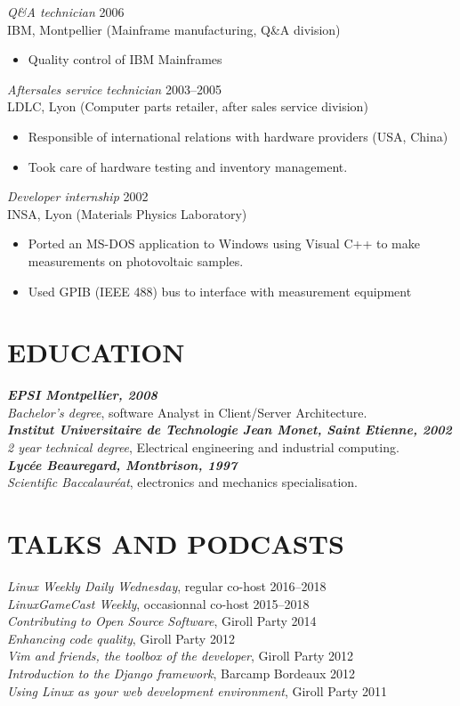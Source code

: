 \documentclass[line,resmargin]{res}
\begin{document}
\begin{resume}
{\sl Q\&A technician\/} \hfill 2006 \\
IBM, Montpellier (Mainframe manufacturing, Q\&A division)
\begin{itemize}  \itemsep -2pt
    \item Quality control of IBM Mainframes
\end{itemize}

{\sl Aftersales service technician\/} \hfill     2003--2005 \\
LDLC, Lyon (Computer parts retailer, after sales service division)
\begin{itemize}  \itemsep -2pt
    \item Responsible of international relations with hardware providers (USA, China)
    \item Took care of hardware testing and inventory management.
\end{itemize}

{\sl Developer internship\/} \hfill 2002 \\
INSA, Lyon (Materials Physics Laboratory)
\begin{itemize} \itemsep -2pt
    \item Ported an MS-DOS application to Windows using Visual C++ to make
    measurements on photovoltaic samples.
    \item Used GPIB (IEEE 488) bus to interface with measurement equipment
\end{itemize}

\section{EDUCATION}
{\sl \textbf{EPSI Montpellier, 2008}\\
Bachelor's degree}, software Analyst in Client/Server Architecture.\\
{\sl \textbf{Institut Universitaire de Technologie Jean Monet, Saint Etienne, 2002}\\
2 year technical degree}, Electrical engineering and  industrial computing.\\
{\sl \textbf{Lyc\'{e}e Beauregard, Montbrison, 1997} \\
Scientific Baccalaur\'{e}at}, electronics and mechanics specialisation.

\section{TALKS AND PODCASTS}
    {\sl Linux Weekly Daily Wednesday}, regular co-host \hfill 2016--2018 \\
    {\sl LinuxGameCast Weekly}, occasionnal co-host \hfill 2015--2018 \\
    {\sl Contributing to Open Source Software}, Giroll Party \hfill 2014 \\
    {\sl Enhancing code quality}, Giroll Party \hfill 2012 \\
    {\sl Vim and friends, the toolbox of the developer}, Giroll Party \hfill 2012 \\
    {\sl Introduction to the Django framework}, Barcamp Bordeaux \hfill 2012 \\
    {\sl Using Linux as your web development environment}, Giroll Party \hfill 2011

\end{resume}
\end{document}
